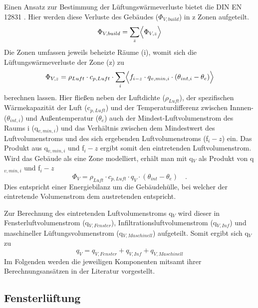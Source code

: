 Einen Ansatz zur Bestimmung der Lüftungswärmeverluste bietet die DIN EN 12831 \cite{DINDeutschesInstitutfurNormunge.V..September2017}.
Hier werden diese Verluste des Gebäudes (\(\Phi_{V,build}\)) in z Zonen aufgeteilt.
\begin{equation}
\label{eq:Gleichung331}
\Phi_{V,build} = \sum_{z} \Bigl\langle \Phi_{V,z} \Bigr\rangle
\end{equation}
Die Zonen umfassen jeweils beheizte Räume (i), womit sich die Lüftungswärmeverluste der Zone (z) zu
\begin{equation}
\label{eq:Gleichung332}
\Phi_{V,z} = \rho_{Luft} \cdot c_{p,Luft} \cdot \sum_{i} \Bigl\langle f_{i-z} \cdot q_{v,min,i} \cdot (\theta_{int,i} - \theta_e) \Bigr\rangle
\end{equation}
berechnen lassen.
Hier fließen neben der Luftdichte (\(\rho_{Luft}\)), der spezifischen Wärmekapazität der Luft (c\(_{p,Luft}\)) und der Temperaturdifferenz zwischen Innnen- (\(\theta_{int,i}\)) und Außentemperatur (\(\theta_{e}\)) auch der Mindest-Luftvolumenstrom des Raums i (q\(_{v,min,i}\)) und das Verhältnis zwischen dem Mindestwert des Luftvolumenstroms und des sich ergebenden Luftvolumenstroms (f\(_i-z\)) ein.
Das Produkt aus q\(_{v,min,i}\) und f\(_i-z\) ergibt somit den eintretenden Luftvolumenstrom.
Wird das Gebäude als eine Zone modelliert, erhält man mit q\(_V\) als Produkt von q\(_{v,min,i}\) und f\(_i-z\) 
\begin{equation}
\label{eq:Gleichung333}
\Phi_{V} = \rho_{Luft} \cdot c_{p,Luft} \cdot q_V \cdot (\theta_{int} - \theta_e) \quad \text{.}
\end{equation}
Dies entspricht einer Energiebilanz um die Gebäudehülle, bei welcher der eintretende Volumenstrom dem austretenden entspricht.

Zur Berechnung des eintretenden Luftvolumenstroms q\(_V\) wird dieser in Fensterluftvolumenstrom (q\(_{V, Fenster}\)), Infiltrationsluftvolumenstrom (q\(_{V, Inf}\)) und maschineller Lüftungsvolumenstrom (q\(_{V, Maschinell}\)) aufgeteilt.
Somit ergibt sich q\(_V\) zu
\begin{equation}
\label{eq:Gleichung334}
q_V = q_{V, Fenster} + q_{V, Inf} + q_{V, Maschinell}
\end{equation}
Im Folgenden werden die jeweiligen Komponenten mitsamt ihrer Berechnungsansätzen in der Literatur vorgestellt.

\subsection{Fensterlüftung}
\label{subsec:Sektion 331}

